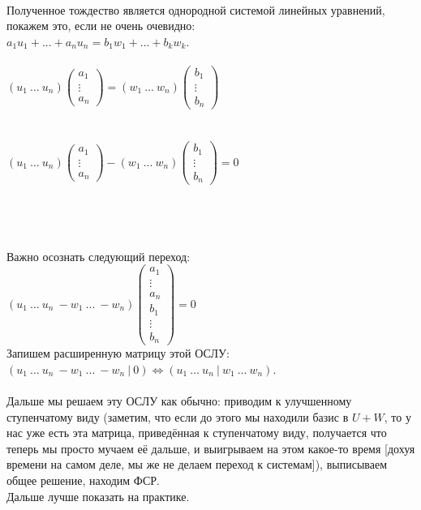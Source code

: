 \documentclass[a4paper,11pt]{report}
\begin{document}
\\
Полученное тождество является однородной системой линейных уравнений, покажем это, если не очень очевидно:\\
$a_1u_1 + ... + a_nu_n =  b_1w_1 + ... + b_kw_k $.\\
\\
$(u_1\ ...\ u_n)
\begin{pmatrix}
 a_1\\
 \vdots\\
 a_n
\end{pmatrix}
=  
(w_1\ ...\ w_n)
\begin{pmatrix}
 b_1\\
 \vdots\\
 b_n
\end{pmatrix}
$\\\\\\
$(u_1\ ...\ u_n)
\begin{pmatrix}
 a_1\\
 \vdots\\
 a_n
\end{pmatrix}
-(w_1\ ...\ w_n)
\begin{pmatrix}
 b_1\\
 \vdots\\
 b_n
\end{pmatrix}
=  0
$\\
\\\\\\\\
Важно осознать следующий переход:\\
$(u_1\ ...\ u_n\ -w_1\ ...\ -w_n)
\begin{pmatrix}
 a_1\\
 \vdots\\
 a_n\\
 b_1\\
 \vdots\\
 b_n
\end{pmatrix}
=  0
$\\
Запишем расширенную матрицу этой ОСЛУ:\\
$(u_1\ ...\ u_n\ -w_1\ ...\ -w_n\ |\ 0) \Leftrightarrow (u_1\ ...\ u_n\ |\ w_1\ ...\ w_n)$.\\
\\
Дальше мы решаем эту ОСЛУ как обычно: приводим к улучшенному ступенчатому виду (заметим, что если до этого мы находили базис в 
$U + W$, то у нас уже есть эта матрица, приведённая к ступенчатому виду, получается что теперь мы просто мучаем её дальше, и выигрываем
на этом какое-то время [дохуя времени на самом деле, мы же не делаем переход к системам]), выписываем общее решение, находим ФСР.\\
Дальше лучше показать на практике.\\
\end{document}
